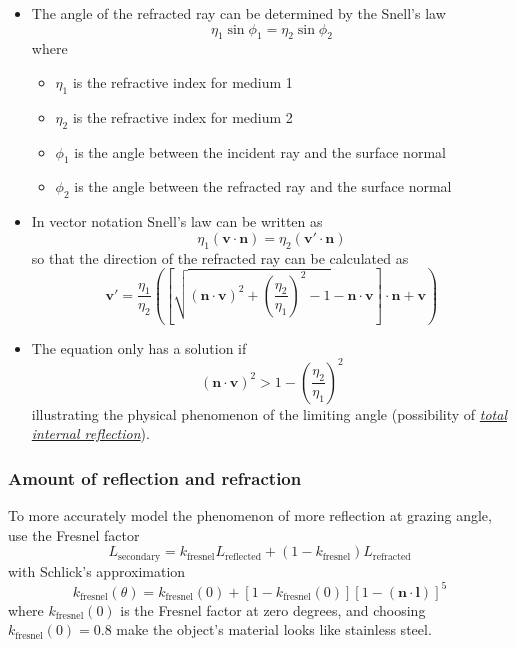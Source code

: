 \documentclass[twocolumn,landscape,10pt]{article}
\theoremstyle{definition}
\begin{document}
\begin{itemize}
    \item The angle of the refracted ray can be determined by the Snell's law
        \[
            \eta_1\sin{\phi_1}=\eta_2\sin{\phi_2}
        \]
        where
        \begin{itemize}
            \item $\eta_1$ is the refractive index for medium 1
            \item $\eta_2$ is the refractive index for medium 2
            \item $\phi_1$ is the angle between the incident ray and the surface normal
            \item $\phi_2$ is the angle between the refracted ray and the surface normal
        \end{itemize} 
    \item In vector notation Snell's law can be written as
        \[
            \eta_1(\mathbf{v}\cdot\mathbf{n})=\eta_2(\mathbf{v}'\cdot\mathbf{n})
        \]
        so that the direction of the refracted ray can be calculated as
        \[
            \mathbf{v}'=\frac{\eta_1}{\eta_2}
            \left(
                \left[
                    \sqrt{{(\mathbf{n}\cdot\mathbf{v})}^{2}+{\left(\frac{\eta_2}{\eta_1}\right)}^{2}-1}
                    -\mathbf{n}\cdot\mathbf{v}
                \right]
                \cdot\mathbf{n}+\mathbf{v}
            \right)
        \]
    \item The equation only has a solution if
        \[
            {(\mathbf{n}\cdot\mathbf{v})}^{2}>1-{\left(\frac{\eta_2}{\eta_1}\right)}^{2}
        \]
        illustrating the physical phenomenon of the limiting angle
        (possibility of \underline{\emph{total internal reflection}}).
\end{itemize} 

\subsubsection{Amount of reflection and refraction}

To more accurately model the phenomenon of more reflection at grazing angle,
use the Fresnel factor
\[
    L_\text{secondary} = k_\text{fresnel}L_\text{reflected} +
    (1-k_\text{fresnel})L_\text{refracted}
\]
with Schlick's approximation
\[
    k_\text{fresnel}(\theta)=k_\text{fresnel}(0)+[1-k_\text{fresnel}(0)]{[1-(\mathbf{n}\cdot\mathbf{l})]}^{5}
\]
where $k_\text{fresnel}(0)$ is the Fresnel factor at zero degrees, and choosing
$k_\text{fresnel}(0)=0.8$ make the object's material looks like stainless steel.
\end{document}
